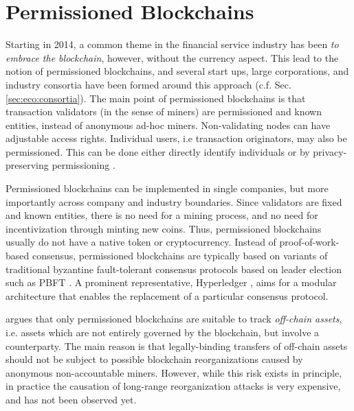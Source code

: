 {\section{Permissioned Blockchains}

Starting in 2014, a common theme in the financial service industry has been \emph{to embrace the blockchain}, however, without the currency aspect. This lead to the notion of permissioned blockchains, and several start ups, large corporations, and industry consortia have been formed around this approach (c.f. Sec. \ref{sec:eco:consortia}). The main point of permissioned blockchains is that transaction validators (in the sense of miners) are permissioned and known entities, instead of anonymous ad-hoc miners. Non-validating nodes can have adjustable access rights. Individual users, i.e transaction originators, may also be permissioned. This can be done either directly identify individuals or by privacy-preserving permissioning \parencite{hardjono2016chain,Hardjono:2016:CCC:2899007.2899012}.

Permissioned blockchains can be implemented in single companies, but more importantly across company and industry boundaries. Since validators are fixed and known entities, there is no need for a mining process, and no need for incentivization through minting new coins. Thus, permissioned blockchains usually do not have a native token or cryptocurrency. Instead of proof-of-work-based consensus, permissioned blockchains are typically based on variants of traditional byzantine fault-tolerant consensus protocols based on leader election such as \ac{PBFT} \parencite{castro1999practical}. A prominent representative, Hyperledger \parencite{cachin2016architecture}, aims for a modular architecture that enables the replacement of a particular consensus protocol.

\cite{swanson2015consensus} argues that only permissioned blockchains are suitable to track \emph{off-chain assets}, i.e. assets which are not entirely governed by the blockchain, but involve a counterparty. The main reason is that legally-binding transfers of off-chain assets should not be subject to possible blockchain reorganizations caused by anonymous non-accountable miners. However, while this risk exists in principle, in practice the causation of long-range reorganization attacks is very expensive, and has not been observed yet.

}
